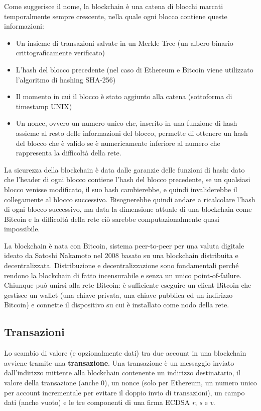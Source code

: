 Come suggerisce il nome, la blockchain è una catena di blocchi marcati temporalmente sempre crescente,
nella quale ogni blocco contiene queste informazioni:

\begin{itemize}
    \item Un insieme di transazioni salvate in un Merkle Tree (un albero binario crittograficamente verificato)
    \item L'hash del blocco precedente (nel caso di Ethereum e Bitcoin viene utilizzato l'algoritmo di hashing SHA-256)
    \item Il momento in cui il blocco è stato aggiunto alla catena (sottoforma di timestamp UNIX)
    \item Un nonce, ovvero un numero unico che, inserito in una funzione di hash assieme al resto delle informazioni del blocco,
    permette di ottenere un hash del blocco che è valido se è numericamente inferiore al numero che rappresenta la difficoltà
    della rete.
\end{itemize}

La sicurezza della blockchain è data dalle garanzie delle funzioni di hash: dato che l'header di ogni blocco contiene
l'hash del blocco precedente, se un qualsiasi blocco venisse modificato, il suo hash cambierebbe, e quindi invaliderebbe 
il collegamente al blocco successivo. Bisognerebbe quindi andare a ricalcolare l'hash di ogni blocco successivo,
ma data la dimensione attuale di una blockchain come Bitcoin e la difficoltà della rete
ciò sarebbe computazionalmente quasi impossibile.

La blockchain è nata con Bitcoin, sistema peer-to-peer per una valuta digitale 
ideato da Satoshi Nakamoto nel 2008 basato su una blockchain distribuita e decentralizzata. \cite{ARTICLE:3}
Distribuzione e decentralizzazione sono fondamentali perché rendono la blockchain di fatto incensurabile
e senza un unico point-of-failure. Chiunque può unirsi alla rete Bitcoin: è sufficiente eseguire un client
Bitcoin che gestisce un wallet (una chiave privata, una chiave pubblica ed un indirizzo Bitcoin) 
e connette il dispositivo su cui è installato come nodo della rete.

\subsection{Transazioni}

Lo scambio di valore (e opzionalmente dati) tra due account in una blockchain avviene tramite una \textbf{transazione}. 
Una transazione è un messaggio inviato dall'indirizzo mittente alla blockchain contenente un indirizzo destinatario, il valore della transazione
(anche 0), un nonce (solo per Ethereum, un numero unico per account incrementale per evitare il doppio invio di transazioni), un campo dati
(anche vuoto) e le tre componenti di una firma ECDSA \emph{r}, \emph{s} e \emph{v}.

